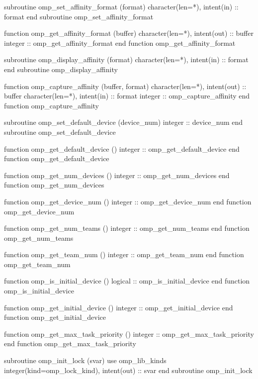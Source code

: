 {\begin{ompfFunction}
          subroutine omp_set_affinity_format (format)
           character(len=*), intent(in) :: format
          end subroutine omp_set_affinity_format

          function omp_get_affinity_format (buffer)
           character(len=*), intent(out) :: buffer
           integer :: omp_get_affinity_format
          end function omp_get_affinity_format

          subroutine omp_display_affinity (format)
           character(len=*), intent(in) :: format
          end subroutine omp_display_affinity

          function omp_capture_affinity (buffer, format)
           character(len=*), intent(out) :: buffer
           character(len=*), intent(in) :: format
           integer :: omp_capture_affinity
          end function omp_capture_affinity

          subroutine omp_set_default_device (device_num)
           integer :: device_num
          end subroutine omp_set_default_device

          function omp_get_default_device ()
           integer :: omp_get_default_device
          end function omp_get_default_device

          function omp_get_num_devices ()
           integer :: omp_get_num_devices
          end function omp_get_num_devices

          function omp_get_device_num ()
           integer :: omp_get_device_num
          end function omp_get_device_num

          function omp_get_num_teams ()
           integer :: omp_get_num_teams
          end function omp_get_num_teams

          function omp_get_team_num ()
           integer :: omp_get_team_num
          end function omp_get_team_num

          function omp_is_initial_device ()
           logical :: omp_is_initial_device
          end function omp_is_initial_device

          function omp_get_initial_device ()
           integer :: omp_get_initial_device
          end function omp_get_initial_device

          function omp_get_max_task_priority ()
           integer :: omp_get_max_task_priority
          end function omp_get_max_task_priority

          subroutine omp_init_lock (svar)
           use omp_lib_kinds
           integer(kind=omp_lock_kind), intent(out) :: svar
          end subroutine omp_init_lock


\end{ompfFunction}}
